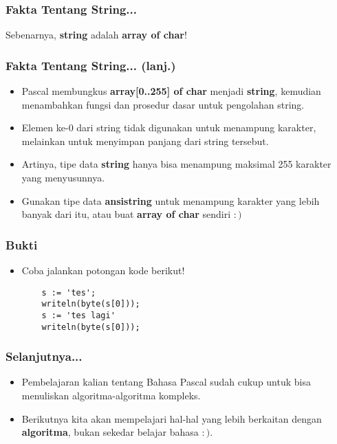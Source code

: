\documentclass{beamer}
\begin{document}
\begin{frame}
\frametitle{Fakta Tentang String...}
Sebenarnya, \textbf{string} adalah \textbf{\alert{array of char}}! 
\end{frame}

\begin{frame}
\frametitle{Fakta Tentang String... (lanj.)}
\begin{itemize}
	\item Pascal membungkus \textbf{array[0..255] of char} menjadi \textbf{string}, kemudian menambahkan fungsi dan prosedur dasar untuk pengolahan string.
	\item Elemen ke-0 dari string tidak digunakan untuk menampung karakter, melainkan untuk menyimpan \alert{panjang dari string tersebut}.
	\item Artinya, tipe data \textbf{string} hanya bisa menampung maksimal 255 karakter yang menyusunnya.
	\item Gunakan tipe data \textbf{ansistring} untuk menampung karakter yang lebih banyak dari itu, atau buat \textbf{array of char} sendiri $:)$
\end{itemize}
\end{frame}

\begin{frame}[fragile]
\frametitle{Bukti}
\begin{itemize}
	\item Coba jalankan potongan kode berikut!
	\begin{lstlisting}
	s := 'tes';
	writeln(byte(s[0]));
	s := 'tes lagi'
	writeln(byte(s[0]));
	\end{lstlisting}
\end{itemize}
\end{frame}

\begin{frame}
\frametitle{Selanjutnya...}
\begin{itemize}
	\item Pembelajaran kalian tentang Bahasa Pascal sudah cukup untuk bisa menuliskan algoritma-algoritma kompleks.
	\item Berikutnya kita akan mempelajari hal-hal yang lebih berkaitan dengan \textbf{algoritma}, bukan sekedar belajar bahasa $:)$. 
\end{itemize}
\end{frame}
\end{document}
